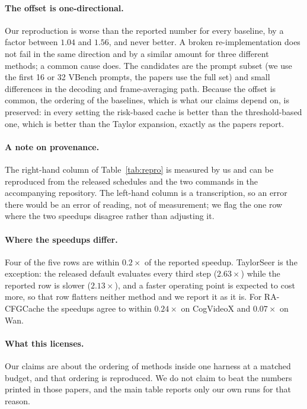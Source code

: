 \paragraph{The offset is one-directional.} Our reproduction is worse than the reported number for every baseline, by a factor between $1.04$ and $1.56$, and never better. A broken re-implementation does not fail in the same direction and by a similar amount for three different methods; a common cause does. The candidates are the prompt subset (we use the first 16 or 32 VBench prompts, the papers use the full set) and small differences in the decoding and frame-averaging path. Because the offset is common, the ordering of the baselines, which is what our claims depend on, is preserved: in every setting the risk-based cache is better than the threshold-based one, which is better than the Taylor expansion, exactly as the papers report.

\paragraph{A note on provenance.} The right-hand column of Table~\ref{tab:repro} is measured by us and can be reproduced from the released schedules and the two commands in the accompanying repository. The left-hand column is a transcription, so an error there would be an error of reading, not of measurement; we flag the one row where the two speedups disagree rather than adjusting it.

\paragraph{Where the speedups differ.} Four of the five rows are within $0.2\times$ of the reported speedup. TaylorSeer is the exception: the released default evaluates every third step ($2.63\times$) while the reported row is slower ($2.13\times$), and a faster operating point is expected to cost more, so that row flatters neither method and we report it as it is. For RA-CFGCache the speedups agree to within $0.24\times$ on CogVideoX and $0.07\times$ on Wan.

\paragraph{What this licenses.} Our claims are about the ordering of methods inside one harness at a matched budget, and that ordering is reproduced. We do not claim to beat the numbers printed in those papers, and the main table reports only our own runs for that reason.
